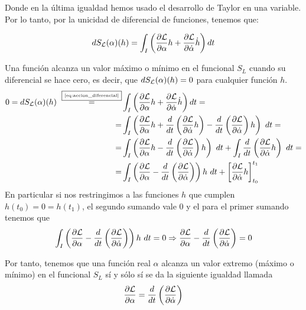 Donde en la última igualdad hemos usado el desarrollo de Taylor en una variable.
Por lo tanto, por la unicidad de diferencial de funciones, tenemos que:

\begin{equation}
	\label{eq:accion_diferencial}
	dS_{\mathcal{L}}(\alpha)(h)=\int_{I}\left( \frac{\partial \mathcal{L}}{\partial\alpha}h+\frac{\partial \mathcal{L}}{\partial\dot{\alpha}}\dot{h}\right) dt
\end{equation}


Una función alcanza un valor máximo o mínimo en el funcional $S_L$ cuando su diferencial se hace cero, es decir, que $dS_{\mathcal{L}}(\alpha)(h)=0$ para cualquier función $h$.
\begin{equation*}
	\begin{split}
		0 = dS_{\mathcal{L}}(\alpha)(h)~\overset{\fbox{\tiny \ref{eq:accion_diferencial}}}{=}&\int_{I}\left( \frac{\partial \mathcal{L}}{\partial\alpha}h+\frac{\partial \mathcal{L}}{\partial\dot{\alpha}}\dot{h}\right) dt =\\
		= & \int_{I}\left( \frac{\partial \mathcal{L}}{\partial\alpha}h+\frac{d}{dt}\left( \frac{\partial \mathcal{L}}{\partial \dot{\alpha}}h \right)-\frac{d}{dt}\left( \frac{\partial \mathcal{L}}{\partial \dot{\alpha}} \right)h\right)\ dt = \\
		= & \int_{I}\left( \frac{\partial \mathcal{L}}{\partial \alpha}h-\frac{d}{dt}\left( \frac{\partial \mathcal{L}}{\partial \dot{\alpha}} \right)h\right)\ dt +\int_{I}\frac{d}{dt}\left( \frac{\partial \mathcal{L}}{\partial \dot{\alpha}}h \right)\ dt = \\
		= & \int_I\left( \frac{\partial \mathcal{L}}{\partial \alpha}-\frac{d}{dt}\left( \frac{\partial \mathcal{L}}{\partial \dot{\alpha}} \right)\right)h\ dt + \left[ \frac{\partial \mathcal{L}}{\partial \dot{\alpha}}h \right]_{t_0}^{t_1}
	\end{split}
\end{equation*}
En particular si nos restringimos a las funciones $h$ que cumplen $h(t_0)=0=h(t_1)$, el segundo sumando vale $0$ y el para el primer sumando tenemos que
\begin{equation*}
	\int_{I}\left( \frac{\partial \mathcal{L}}{\partial \alpha}-\frac{d}{dt}\left( \frac{\partial \mathcal{L}}{\partial \dot{\alpha}} \right)\right)h\ dt = 0 \Rightarrow \frac{\partial \mathcal{L}}{\partial \alpha}-\frac{d}{dt}\left( \frac{\partial \mathcal{L}}{\partial \dot{\alpha}} \right) = 0
\end{equation*}

Por tanto, tenemos que una función real $\alpha$ alcanza un valor extremo (máximo o mínimo) en el funcional $S_L$ sí y sólo sí se da la siguiente igualdad llamada 
\begin{equation}
	\label{eq:euler-lagrange}
	\frac{\partial \mathcal{L}}{\partial \alpha}=\frac{d}{dt}\left( \frac{\partial \mathcal{L}}{\partial \dot{\alpha}} \right)
\end{equation}

